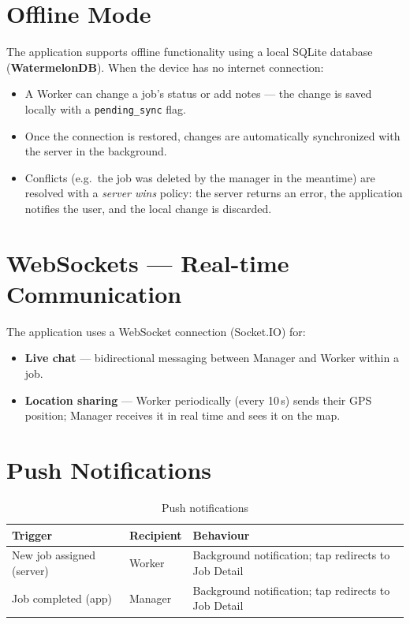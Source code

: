 \section{Offline Mode}

The application supports offline functionality using a local SQLite database (\textbf{WatermelonDB}). When the device has no internet connection:

\begin{itemize}
  \item A Worker can change a job's status or add notes --- the change is saved locally with a \texttt{pending\_sync} flag.
  \item Once the connection is restored, changes are automatically synchronized with the server in the background.
  \item Conflicts (e.g.\ the job was deleted by the manager in the meantime) are resolved with a \textit{server wins} policy: the server returns an error, the application notifies the user, and the local change is discarded.
\end{itemize}

\section{WebSockets --- Real-time Communication}

The application uses a WebSocket connection (Socket.IO) for:

\begin{itemize}
  \item \textbf{Live chat} --- bidirectional messaging between Manager and Worker within a job.
  \item \textbf{Location sharing} --- Worker periodically (every 10\,s) sends their GPS position; Manager receives it in real time and sees it on the map.
\end{itemize}

\section{Push Notifications}

\begin{table}[H]
  \centering
  \begin{tabularx}{\textwidth}{llX}
    \toprule
    \textbf{Trigger} & \textbf{Recipient} & \textbf{Behaviour} \\
    \midrule
    New job assigned (server) & Worker  & Background notification; tap redirects to Job Detail \\
    Job completed (app)       & Manager & Background notification; tap redirects to Job Detail \\
    \bottomrule
  \end{tabularx}
  \caption{Push notifications}
\end{table}

